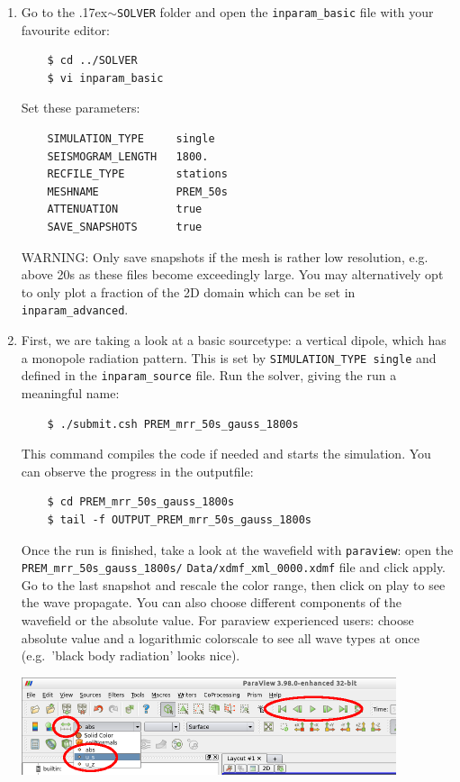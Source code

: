 \documentclass{article}
\newcommand{\ttilde}[0]{\raise.17ex\hbox{$\scriptstyle\sim$}}
\begin{document}
\begin{enumerate}
    \item Go to the \ttilde\verb|SOLVER| folder and open the
    \verb|inparam_basic| file with your favourite editor:
    \begin{verbatim}
    $ cd ../SOLVER
    $ vi inparam_basic
    \end{verbatim}
    Set these parameters:
    \begin{verbatim}
    SIMULATION_TYPE     single
    SEISMOGRAM_LENGTH   1800.
    RECFILE_TYPE        stations
    MESHNAME            PREM_50s
    ATTENUATION         true
    SAVE_SNAPSHOTS      true
    \end{verbatim}
    WARNING: Only save snapshots if the mesh is rather low resolution,
    e.g. above 20s as these files become exceedingly large. You may
    alternatively opt to only plot a fraction of the 2D domain which
    can be set in \verb|inparam_advanced|.

    \item First, we are taking a look at a basic sourcetype: a vertical dipole, which has
    a monopole radiation pattern. This is set by \verb|SIMULATION_TYPE single| and defined
    in the \verb|inparam_source| file. Run the solver, giving the run a meaningful name:
    \begin{verbatim}
    $ ./submit.csh PREM_mrr_50s_gauss_1800s
    \end{verbatim}
    This command compiles the code if needed and starts the simulation. You can observe
    the progress in the outputfile:
    \begin{verbatim}
    $ cd PREM_mrr_50s_gauss_1800s
    $ tail -f OUTPUT_PREM_mrr_50s_gauss_1800s
    \end{verbatim}
    Once the run is finished, take a look at the wavefield with \verb|paraview|: open
    the \verb|PREM_mrr_50s_gauss_1800s/| \verb|Data/xdmf_xml_0000.xdmf|
    file and click apply. Go to the last snapshot and rescale the color range,
    then click on play to see the wave propagate.  You can also choose
    different components of the wavefield or the absolute value.  For paraview
    experienced users: choose absolute value and a logarithmic colorscale to
    see all wave types at once (e.g.\ 'black body radiation' looks nice).

    \begin{center}
    \includegraphics[width=110mm]{paraview2.png} \hspace{5mm}
    \end{center}


\end{enumerate}
\end{document}
